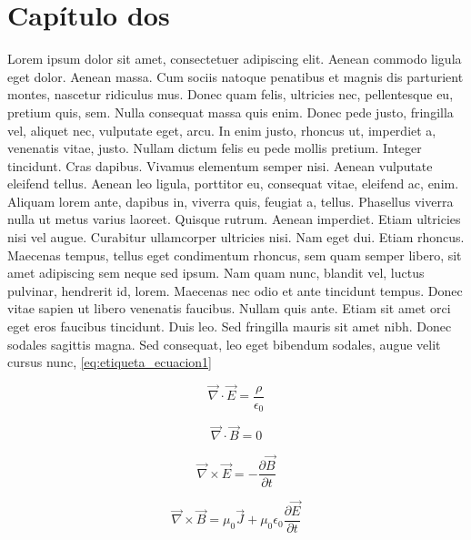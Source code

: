 
\chapter{Capítulo dos}

Lorem ipsum dolor sit amet, consectetuer adipiscing elit. Aenean commodo ligula eget dolor. Aenean massa. Cum sociis natoque penatibus et magnis dis parturient montes, nascetur ridiculus mus. Donec quam felis, ultricies nec, pellentesque eu, pretium quis, sem. Nulla consequat massa quis enim. Donec pede justo, fringilla vel, aliquet nec, vulputate eget, arcu. In enim justo, rhoncus ut, imperdiet a, venenatis vitae, justo. Nullam dictum felis eu pede mollis pretium. Integer tincidunt. Cras dapibus. Vivamus elementum semper nisi. Aenean vulputate eleifend tellus. Aenean leo ligula, porttitor eu, consequat vitae, eleifend ac, enim. Aliquam lorem ante, dapibus in, viverra quis, feugiat a, tellus. Phasellus viverra nulla ut metus varius laoreet. Quisque rutrum. Aenean imperdiet. Etiam ultricies nisi vel augue. Curabitur ullamcorper ultricies nisi. Nam eget dui. Etiam rhoncus. Maecenas tempus, tellus eget condimentum rhoncus, sem quam semper libero, sit amet adipiscing sem neque sed ipsum. Nam quam nunc, blandit vel, luctus pulvinar, hendrerit id, lorem. Maecenas nec odio et ante tincidunt tempus. Donec vitae sapien ut libero venenatis faucibus. Nullam quis ante. Etiam sit amet orci eget eros faucibus tincidunt. Duis leo. Sed fringilla mauris sit amet nibh. Donec sodales sagittis magna. Sed consequat, leo eget bibendum sodales, augue velit cursus nunc,
\ref{eq:etiqueta_ecuacion1}

\begin{equation} \label{eq:etiqueta_ecuacion1}
	\vec{\nabla}\cdot \vec{E}= \dfrac{\rho}
{\epsilon_0}
\end{equation}

\begin{equation} \label{eq:etiqueta_ecuacion2}
	\vec{\nabla}\cdot \vec{B}= 0
\end{equation}

\begin{equation} \label{eq:etiqueta_ecuacion3}
\vec{\nabla}\times\vec{E}=-\dfrac{\partial 
\vec{B}}{\partial t}
\end{equation}

\begin{equation} \label{eq:etiqueta_ecuacion4}
\vec{\nabla}\times \vec{B}=\mu_0\vec{J}+\mu_0
\epsilon_0 \dfrac{\partial \vec{E}}
{\partial t}
\end{equation}

